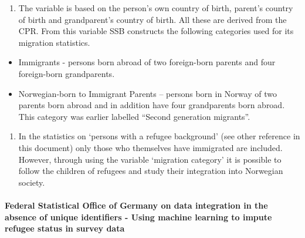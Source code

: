 \documentclass[
]{article}
\providecommand{\tightlist}{%
  \setlength{\itemsep}{0pt}\setlength{\parskip}{0pt}}
\begin{document}
\begin{enumerate}
\def\labelenumi{\arabic{enumi}.}
\setcounter{enumi}{259}
\tightlist
\item
  The variable is based on the person's own country of birth,
  parent's country of birth and grandparent's country of birth. All
  these are derived from the CPR. From this variable SSB constructs
  the following categories used for its migration statistics.
\end{enumerate}

\begin{itemize}
\item
  Immigrants - persons born abroad of two foreign-born parents and
  four foreign-born grandparents.
\item
  Norwegian-born to Immigrant Parents -- persons born in Norway of two
  parents born abroad and in addition have four grandparents born
  abroad. This category was earlier labelled ``Second generation
  migrants''.
\end{itemize}

\begin{enumerate}
\def\labelenumi{\arabic{enumi}.}
\setcounter{enumi}{260}
\tightlist
\item
  In the statistics on `persons with a refugee background' (see other
  reference in this document) only those who themselves have
  immigrated are included. However, through using the variable
  `migration category' it is possible to follow the children of
  refugees and study their integration into Norwegian society.
\end{enumerate}

\hypertarget{federal-statistical-office-of-germany-on-data-integration-in-the-absence-of-unique-identifiers---using-machine-learning-to-impute-refugee-status-in-survey-data-1}{%
\paragraph{Federal Statistical Office of Germany on data integration in the absence of unique identifiers - Using machine learning to impute refugee status in survey data}\label{federal-statistical-office-of-germany-on-data-integration-in-the-absence-of-unique-identifiers---using-machine-learning-to-impute-refugee-status-in-survey-data-1}}
\end{document}
